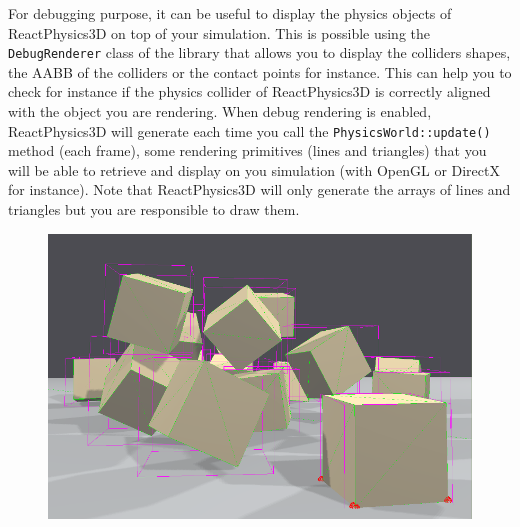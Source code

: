 \documentclass[a4paper,12pt]{article}
\begin{document}
  \begin{sloppypar}
   For debugging purpose, it can be useful to display the physics objects of ReactPhysics3D on top of your simulation. This is possible using the
   \texttt{DebugRenderer} class of the library that allows you to display the colliders shapes, the AABB of the colliders or the contact points for
   instance. This can help you to check for instance if the physics collider of ReactPhysics3D is correctly aligned with the object you are rendering.
   When debug rendering is enabled, ReactPhysics3D will generate each time you call the \texttt{PhysicsWorld::update()} method (each frame), some rendering
   primitives (lines and triangles) that you will be able to retrieve and display on you simulation (with OpenGL or DirectX for instance). Note that
   ReactPhysics3D will only generate the arrays of lines and triangles but you are responsible to draw them. \\
  \end{sloppypar}

  \begin{figure}[!ht]
      \centering
      \includegraphics[scale=0.45]{DebugRendering.png}
       \label{fig:debugrendering}
  \end{figure}
\end{document}
